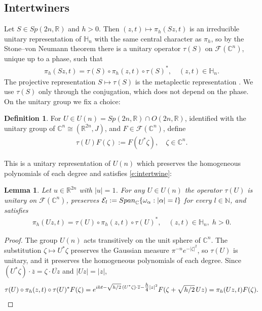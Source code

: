 \documentclass[11pt]{amsart}
\theoremstyle{plain}
\newtheorem{lemma}[theorem]{Lemma}
\theoremstyle{definition}
\newtheorem{definition}[theorem]{Definition}
\theoremstyle{remark}
\numberwithin{equation}{section}
\def\cE{\mathcal{E}}
\def\cF{\mathcal{F}}
\def\R{{\mathbb R}}%
\def\C{{\mathbb C}}%
\def\N{{\mathbb N}}%
\def \heis {\mathbb{H}}
\numberwithin{equation}{section}
\begin{document}
\subsection{Intertwiners}
Let $S\in Sp(2n, \R)$ and $h>0$. Then $(z, t)\mapsto\pi_h(Sz, t)$ is an irreducible unitary representation of $\heis_n$ with the same central character as $\pi_h$, so by the Stone--von Neumann theorem there is a unitary operator $\tau(S)$ on $\cF(\C^n)$, unique up to a phase, such that
\begin{align}\label{e:intertwine}
    \pi_h(Sz, t)=\tau(S)\circ\pi_h(z, t)\circ\tau(S)^*, \quad (z, t)\in \heis_n.
\end{align}
The projective representation $S\mapsto\tau(S)$ is the metaplectic representation \cite[Ch.~4]{follandHarmonicAnalysisPhase1989}. We use $\tau(S)$ only through the conjugation, which does not depend on the phase. On the unitary group we fix a choice:
\begin{definition}\label{d:tau}
	For $U\in U(n)=Sp(2n, \R)\cap O(2n, \R)$, identified with the unitary group of $\C^n\cong(\R^{2n}, J)$, and $F\in \cF(\C^n)$, define
	\begin{align*}
		{\tau}(U)F(\zeta):=F(U^*\zeta), \quad \zeta \in \C^n.
	\end{align*}
\end{definition}
This is a unitary representation of $U(n)$ which preserves the homogeneous polynomials of each degree and satisfies \eqref{e:intertwine}:
\begin{lemma}\label{l:rotateAxis}
    Let $u\in \R^{2n}$ with $|u|=1$.  For any $U\in U(n)$ the operator $\tau(U)$  is unitary on $\cF(\C^n)$, preserves $\cE_l:={\rm Span}_\C\{\omega_\alpha: |\alpha|=l\}$ for every $l\in \N$, and satisfies
    \begin{align*}
        \pi_h(Uz, t)=\tau(U)\circ\pi_h(z, t)\circ\tau(U)^*, \quad (z, t)\in \heis_n, \; h>0.
    \end{align*}
\end{lemma}

\begin{proof}
    The group $U(n)$ acts transitively on the unit sphere of $\C^n$. The substitution $\zeta\mapsto U^*\zeta$ preserves the Gaussian measure $\pi^{-n}e^{-|\zeta|^2}$, so $\tau(U)$ is unitary, and it preserves the homogeneous polynomials of each degree. Since $(U^*\zeta)\cdot\overline{z}=\zeta\cdot\overline{Uz}$ and $|Uz|=|z|$,
    \begin{align*}
        \tau(U)\circ{\pi}_{h}(z, t)\circ\tau(U)^*F(\zeta)
        =e^{i ht-\sqrt{h/2}\,(U^*\zeta)\cdot\overline{z}-\tfrac{ h}{4}|z|^2}F(\zeta+\sqrt{h/2}\, Uz)
        ={\pi}_h(Uz, t)F(\zeta).\qedhere
    \end{align*}
\end{proof}
\end{document}
